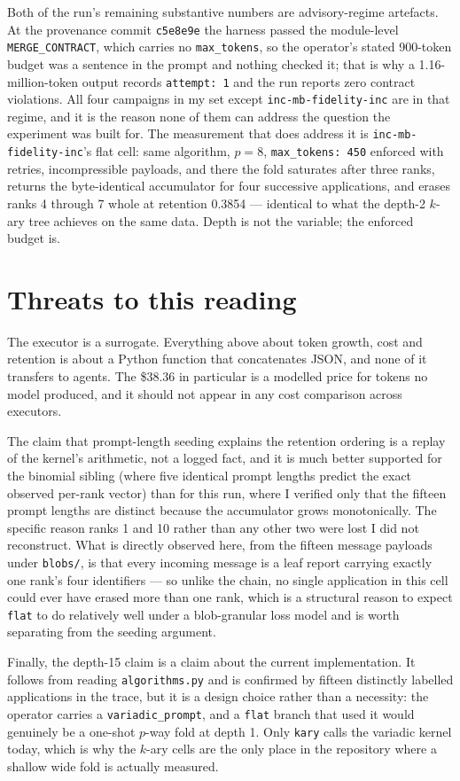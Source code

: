 \documentclass[11pt]{article}
\begin{document}
Both of the run's remaining substantive numbers are advisory-regime artefacts. At the
provenance commit \texttt{c5e8e9e} the harness passed the module-level
\texttt{MERGE\_CONTRACT}, which carries no \texttt{max\_tokens}, so the operator's stated
900-token budget was a sentence in the prompt and nothing checked it; that is why a
1.16-million-token output records \texttt{attempt: 1} and the run reports zero contract
violations. All four campaigns in my set except \texttt{inc-mb-fidelity-inc} are in that
regime, and it is the reason none of them can address the question the experiment was built
for. The measurement that does address it is \texttt{inc-mb-fidelity-inc}'s flat cell: same
algorithm, $p=8$, \texttt{max\_tokens: 450} enforced with retries, incompressible payloads,
and there the fold saturates after three ranks, returns the byte-identical accumulator for
four successive applications, and erases ranks 4 through 7 whole at retention 0.3854 ---
identical to what the depth-2 $k$-ary tree achieves on the same data. Depth is not the
variable; the enforced budget is.

\section{Threats to this reading}

The executor is a surrogate. Everything above about token growth, cost and retention is
about a Python function that concatenates JSON, and none of it transfers to agents. The
\$38.36 in particular is a modelled price for tokens no model produced, and it should not
appear in any cost comparison across executors.

The claim that prompt-length seeding explains the retention ordering is a replay of the
kernel's arithmetic, not a logged fact, and it is much better supported for the binomial
sibling (where five identical prompt lengths predict the exact observed per-rank vector)
than for this run, where I verified only that the fifteen prompt lengths are distinct
because the accumulator grows monotonically. The specific reason ranks 1 and 10 rather than
any other two were lost I did not reconstruct. What is directly observed here, from the
fifteen message payloads under \texttt{blobs/}, is that every incoming message is a leaf
report carrying exactly one rank's four identifiers --- so unlike the chain, no single
application in this cell could ever have erased more than one rank, which is a structural
reason to expect \texttt{flat} to do relatively well under a blob-granular loss model and is
worth separating from the seeding argument.

Finally, the depth-15 claim is a claim about the current implementation. It follows from
reading \texttt{algorithms.py} and is confirmed by fifteen distinctly labelled applications
in the trace, but it is a design choice rather than a necessity: the operator carries a
\texttt{variadic\_prompt}, and a \texttt{flat} branch that used it would genuinely be a
one-shot $p$-way fold at depth 1. Only \texttt{kary} calls the variadic kernel today, which
is why the $k$-ary cells are the only place in the repository where a shallow wide fold is
actually measured.
\end{document}
